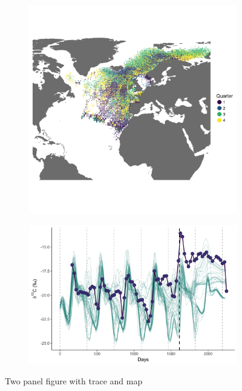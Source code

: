 \documentclass[a4paper,12pt]{article}
\begin{document}
\begin{figure}
  \centering
    \begin{subfigure}[b]{0.45\textwidth}
      \centering
      \includegraphics[width = \linewidth]{figures/Figure-1b-migratory-model-full-map.png}
      \label{fig2a}
    \end{subfigure}
    \begin{subfigure}[b]{0.45\textwidth}
      \centering
      \includegraphics[width = \linewidth]{figures/Figure-1c-migratory-model-d13C.png}
      \label{fig2b}
    \end{subfigure} 
  \caption{Two panel figure with trace and map}
\end{figure}
\end{document}
